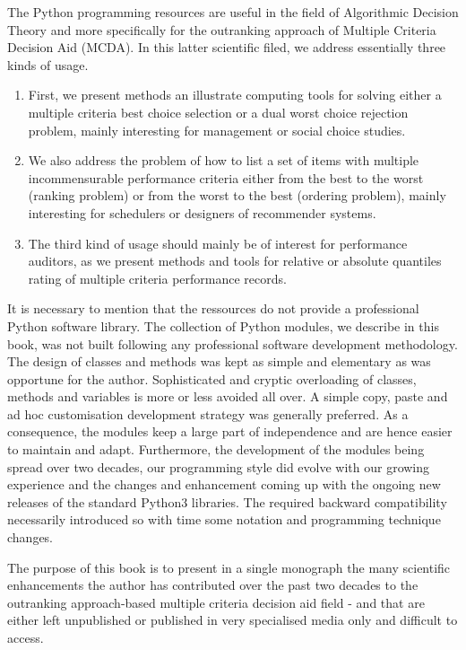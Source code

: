 The \Digraph Python programming resources are useful in the field of Algorithmic Decision Theory and more specifically for the outranking approach of Multiple Criteria Decision Aid (MCDA). In this latter scientific filed, we address essentially three kinds of usage.
\begin{enumerate}[topsep=3pt,partopsep=0pt]
\item First, we present methods an illustrate computing tools for solving either a multiple criteria best choice selection or a dual worst choice rejection problem, mainly interesting for management or social choice studies.
\item We also address the problem of how to list a set of items with multiple incommensurable performance criteria either from the best to the worst (ranking problem) or from the worst to the best (ordering problem), mainly interesting for schedulers or designers of recommender systems.
\item The third kind of usage should mainly be of interest for performance auditors, as we present methods and tools for relative or absolute quantiles rating of multiple criteria performance records. 
\end{enumerate}

It is necessary to mention that the \Digraph ressources do not provide a professional Python software library. The collection of Python modules, we describe in this book, was not built following any professional software development methodology. The design of classes and methods was kept as simple and elementary as was opportune for the author. Sophisticated and cryptic overloading of classes, methods and variables is more or less avoided all over. A simple copy, paste and ad hoc customisation development strategy was generally preferred. As a consequence, the \Digraph modules keep a large part of independence and are hence easier to maintain and adapt.  Furthermore, the development of the \Digraph modules being spread over two decades, our programming style did evolve with our growing experience and the changes and enhancement coming up with the ongoing new releases of the standard Python3 libraries. The required backward compatibility necessarily introduced so with time some notation and programming technique changes.


The purpose of this book is to present in a single monograph the many scientific enhancements the author has contributed over the past two decades to the outranking approach-based multiple criteria decision aid field - and that are either left unpublished or published in very specialised media only and difficult to access.  

